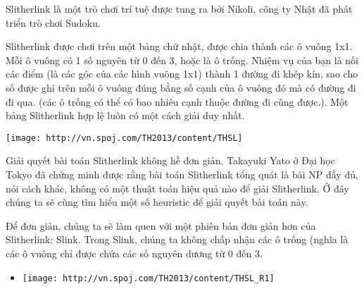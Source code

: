 Slitherlink là một trò chơi trí tuệ được tung ra bởi Nikoli, công ty Nhật đã phát triển trò chơi Sudoku.

Slitherlink được chơi trên một bảng chữ nhật, được chia thành các ô vuông 1x1. Mỗi ô vuông có 1 số nguyên từ 0 đến 3, hoặc là ô trống. Nhiệm vụ của bạn là nối các điểm (là các góc của các hình vuông 1x1) thành 1 đường đi khép kín, sao cho số được ghi trên mỗi ô vuông đúng bằng số cạnh của ô vuông đó mà có đường đi đi qua. (các ô trống có thể có bao nhiêu cạnh thuộc đường đi cũng được.). Một bảng Slitherlink hợp lệ luôn có một cách giải duy nhất.


\texttt{[image: http://vn.spoj.com/TH2013/content/THSL]}

Giải quyết bài toán Slitherlink không hề đơn giản. Takayuki Yato ở Đại học Tokyo đã chứng minh được rằng bài toán Slitherlink tổng quát là bài NP đầy đủ, nói cách khác, không có một thuật toán hiệu quả nào để giải Slitherlink. Ở đây chúng ta sẽ cùng tìm hiểu một số heuristic để giải quyết bài toán này.

Để đơn giản, chúng ta sẽ làm quen với một phiên bản đơn giản hơn của Slitherlink: Slink. Trong Slink, chúng ta không chấp nhận các ô trống (nghĩa là các ô vuông chỉ được chứa các số nguyên dương từ 0 đến 3.
\begin{itemize}
	\item 
\texttt{[image: http://vn.spoj.com/TH2013/content/THSL\_R1]}   
\end{itemize}

